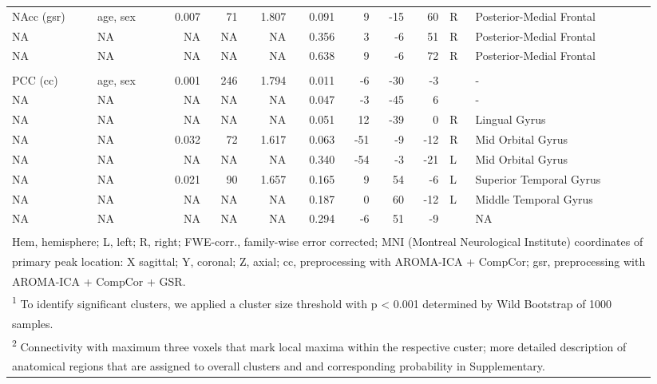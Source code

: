 \documentclass[
]{article}
\begin{document}
\begin{landscape}
\begin{table}
{\begin{tabular}[t]{llrrrrrrrll}
\hspace{1em}NAcc (gsr) & age, sex & 0.007 & 71 & 1.807 & 0.091 & 9 & -15 & 60 & R & Posterior-Medial Frontal\\
\hspace{1em}NA & NA & NA & NA & NA & 0.356 & 3 & -6 & 51 & R & Posterior-Medial Frontal\\
\hspace{1em}NA & NA & NA & NA & NA & 0.638 & 9 & -6 & 72 & R & Posterior-Medial Frontal\\
\addlinespace[0.3em]
\multicolumn{11}{l}{\textbf{average BMI (decrease)}}\\
\hspace{1em}PCC (cc) & age, sex & 0.001 & 246 & 1.794 & 0.011 & -6 & -30 & -3 &  & -\\
\hspace{1em}NA & NA & NA & NA & NA & 0.047 & -3 & -45 & 6 &  & -\\
\hspace{1em}NA & NA & NA & NA & NA & 0.051 & 12 & -39 & 0 & R & Lingual Gyrus\\
\hspace{1em}NA & NA & 0.032 & 72 & 1.617 & 0.063 & -51 & -9 & -12 & R & Mid Orbital Gyrus\\
\hspace{1em}NA & NA & NA & NA & NA & 0.340 & -54 & -3 & -21 & L & Mid Orbital Gyrus\\
\hspace{1em}NA & NA & 0.021 & 90 & 1.657 & 0.165 & 9 & 54 & -6 & L & Superior Temporal Gyrus\\
\hspace{1em}NA & NA & NA & NA & NA & 0.187 & 0 & 60 & -12 & L & Middle Temporal Gyrus\\
\hspace{1em}NA & NA & NA & NA & NA & 0.294 & -6 & 51 & -9 &  & NA\\
\bottomrule
\multicolumn{11}{l}{\textsuperscript{} Hem, hemisphere; L, left; R, right; FWE-corr., family-wise error corrected; MNI (Montreal Neurological Institute) coordinates of}\\
\multicolumn{11}{l}{primary peak location: X sagittal; Y, coronal; Z, axial; cc, preprocessing with AROMA-ICA + CompCor; gsr, preprocessing with}\\
\multicolumn{11}{l}{AROMA-ICA + CompCor + GSR.}\\
\multicolumn{11}{l}{\textsuperscript{1} To identify significant clusters, we applied a cluster size threshold with p < 0.001 determined by Wild Bootstrap of 1000}\\
\multicolumn{11}{l}{samples.}\\
\multicolumn{11}{l}{\textsuperscript{2} Connectivity with maximum three voxels that mark local maxima within the respective custer; more detailed description of}\\
\multicolumn{11}{l}{anatomical regions that are assigned to overall clusters and and corresponding probability in Supplementary.}\\
\end{tabular}}
\end{table}
\end{landscape}
\end{document}
